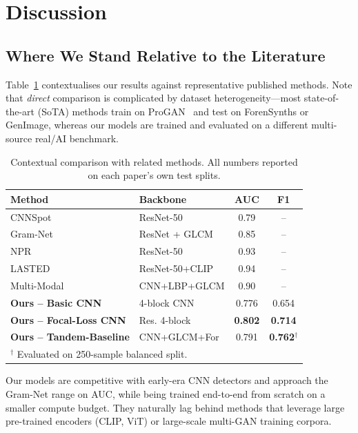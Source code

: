 \documentclass[10pt,twocolumn]{article}
\begin{document}
\section{Discussion}
\label{sec:discussion}

\subsection{Where We Stand Relative to the Literature}

Table~\ref{tab:sota_compare} contextualises our results against
representative published methods.
Note that \emph{direct} comparison is complicated by dataset
heterogeneity---most state-of-the-art (SoTA) methods train on
ProGAN~\cite{wang2020cnns} and test on ForenSynths or GenImage,
whereas our models are trained and evaluated on a different
multi-source real/AI benchmark.

\begin{table}[h]
\centering
\caption{Contextual comparison with related methods.
All numbers reported on each paper's own test splits.}
\label{tab:sota_compare}
\small
\begin{tabular}{llcc}
\toprule
\textbf{Method} & \textbf{Backbone} & \textbf{AUC} & \textbf{F1} \\
\midrule
CNNSpot~\cite{wang2020cnns}         & ResNet-50      & 0.79 & -- \\
Gram-Net~\cite{liu2020gram}         & ResNet + GLCM  & 0.85 & -- \\
NPR~\cite{tan2024npr}               & ResNet-50      & 0.93 & -- \\
LASTED~\cite{wu2023lasted}          & ResNet-50+CLIP & 0.94 & -- \\
Multi-Modal~\cite{frontiers2025multimodal} & CNN+LBP+GLCM & 0.90 & -- \\
\midrule
\textbf{Ours -- Basic CNN}          & 4-block CNN    & 0.776 & 0.654 \\
\textbf{Ours -- Focal-Loss CNN}     & Res. 4-block   & \textbf{0.802} & \textbf{0.714} \\
\textbf{Ours -- Tandem-Baseline}    & CNN+GLCM+For   & 0.791 & \textbf{0.762}$^\dagger$ \\
\bottomrule
\multicolumn{4}{l}{\footnotesize $^\dagger$ Evaluated on 250-sample balanced split.} \\
\end{tabular}
\end{table}

Our models are competitive with early-era CNN detectors and approach
the Gram-Net range on AUC, while being trained end-to-end from scratch
on a smaller compute budget.
They naturally lag behind methods that leverage large pre-trained
encoders (CLIP, ViT) or large-scale multi-GAN training corpora.
\end{document}
